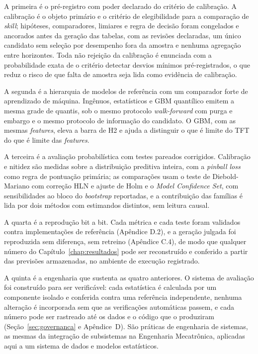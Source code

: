 A primeira é o pré-registro com poder declarado do critério de calibração. A calibração é o objeto primário e o critério de elegibilidade para a comparação de \textit{skill}; hipóteses, comparadores, limiares e regra de decisão foram congelados e ancorados antes da geração das tabelas, com as revisões declaradas, um único candidato sem seleção por desempenho fora da amostra e nenhuma agregação entre horizontes. Toda não rejeição da calibração é enunciada com a probabilidade exata de o critério detectar desvios mínimos pré-registrados, o que reduz o risco de que falta de amostra seja lida como evidência de calibração.

A segunda é a hierarquia de modelos de referência com um comparador forte de aprendizado de máquina. Ingênuos, estatísticos e GBM quantílico emitem a mesma grade de quantis, sob o mesmo protocolo \textit{walk-forward} com purga e embargo e o mesmo protocolo de informação do candidato. O GBM, com as mesmas \textit{features}, eleva a barra de H2 e ajuda a distinguir o que é limite do TFT do que é limite das \textit{features}.

A terceira é a avaliação probabilística com testes pareados corrigidos. Calibração e nitidez são medidas sobre a distribuição preditiva inteira, com a \textit{pinball loss} como regra de pontuação primária; as comparações usam o teste de Diebold-Mariano com correção HLN e ajuste de Holm e o \textit{Model Confidence Set}, com sensibilidades ao bloco do \textit{bootstrap} reportadas, e a contribuição das famílias é lida por dois métodos com estimandos distintos, sem leitura causal.

A quarta é a reprodução bit a bit. Cada métrica e cada teste foram validados contra implementações de referência (Apêndice D.2), e a geração julgada foi reproduzida sem diferença, sem retreino (Apêndice C.4), de modo que qualquer número do Capítulo~\ref{chap:resultados} pode ser reconstruído e conferido a partir das previsões armazenadas, no ambiente de execução registrado.

A quinta é a engenharia que sustenta as quatro anteriores. O sistema de avaliação foi construído para ser verificável: cada estatística é calculada por um componente isolado e conferida contra uma referência independente, nenhuma alteração é incorporada sem que as verificações automáticas passem, e cada número pode ser rastreado até os dados e o código que o produziram (Seção~\ref{sec:governanca} e Apêndice~D). São práticas de engenharia de sistemas, as mesmas da integração de subsistemas na Engenharia Mecatrônica, aplicadas aqui a um sistema de dados e modelos estatísticos.

